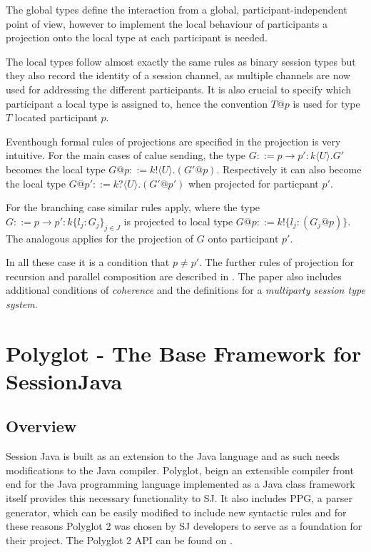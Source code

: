 The global types define the interaction from a global, participant-independent point of view, however to implement the local behaviour of participants a projection onto the local type at each participant is needed.

The local types follow almost exactly the same rules as binary session types but they also record the identity of a session channel, as multiple channels are now used for addressing the different participants. It is also crucial to specify which participant a local type is assigned to, hence the convention $ T @ p $  is used for type $T$ located participant $p$.

Eventhough formal rules of projections are specified in \cite{multiparty_sess_types} the projection is very intuitive. For the main cases of calue sending, the type $G ::= p \rightarrow p' : k \langle U \rangle . G'$ becomes the local type $G @ p ::= k! \langle U \rangle . (G' @ p)$. Respectively it can also become the local type $G @ p' ::= k? \langle U \rangle . (G' @ p')$ when projected for particpant $p'$.

For the branching case similar rules apply, where the type $G::= p \rightarrow p' : k \lbrace l_{j}:G_{j} \rbrace _{j \in J} $ is projected to local type $G @ p ::= k! \lbrace l_{j}: (G_{j} @ p) \rbrace$. The analogous applies for the projection of $G$ onto participant $p'$.

In all these case it is a condition that $p \neq p'$. The further rules of projection for recursion and parallel composition are described in \cite{multiparty_sess_types}. The paper also includes additional conditions of \textit{coherence} and the definitions for a \textit{multiparty session type system}.





\section{Polyglot - The Base Framework for SessionJava}
\label{sec:polyglot}

\subsection{Overview}
\label{subsec:polyglotoverview}
Session Java is built as an extension to the Java language and as such needs modifications to the Java compiler. Polyglot, beign an extensible compiler front end for the Java programming language implemented as a Java class framework \cite{polyglotonline} itself provides this necessary functionality to SJ. It also includes PPG, a parser generator, which can be easily modified to include new syntactic rules and for these reasons Polyglot 2 was chosen by SJ developers to serve as a foundation for their project. The Polyglot 2 API can be found on \cite{polyglotapi}.

